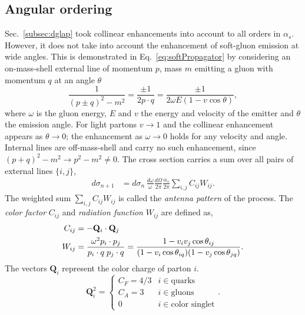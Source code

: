 \subsection{Angular ordering}
\label{sec:angularOrdering}
Sec.~\ref{subsec:dglap} took collinear enhancements into account to all orders in
\(\alpha_s\). However, it does not take into account the enhancement of soft-gluon emission at wide angles.
This is demonstrated in Eq.~\ref{eq:softPropagator} by considering an on-mass-shell external line of
momentum \(p\), mass \(m\) emitting a gluon with momentum \(q\)  at an angle \(\theta\)
\begin{equation}
	\frac{1}{(p\pm q)^2 - m^2} = \frac{\pm1}{2p\cdot q}
	= \frac{\pm1}{2\omega E(1-v\cos\theta)},
	\label{eq:softPropagator}
\end{equation}
where \(\omega\) is the gluon energy, \(E\) and \(v\) the energy and velocity of the
emitter and \(\theta\) the emission angle. For light partons \(v\to1\) and the
collinear enhancement appears as \(\theta\to0\); the enhancement as \(\omega\to0\)
holds for any velocity and angle. Internal lines  are off-mass-shell and carry no such enhancement, since
\((p+q)^2-m^2\to p^2-m^2\neq0\). The cross section carries a sum over all pairs of external lines \(\{i,j\}\),
\begin{align}
	\label{eq:antennaSplitXSec}
	d\sigma_{n+1} & = d\sigma_n\,\frac{d\omega}{\omega}\frac{d\Omega}{2\pi}
	\frac{\alpha_s}{2\pi}\sum_{i,j}C_{ij}W_{ij}.
\end{align}
The weighted sum \(\sum_{i,j}C_{ij}W_{ij}\)  is called the \emph{antenna pattern} of the process. The \emph{color factor} \(C_{ij}\) and \emph{radiation function} \(W_{ij}\)  are defined as,
\begin{align}
	C_{ij} & = -\mathbf{Q}_i\cdot\mathbf{Q}_j  \notag               \\
	W_{ij} & = \frac{\omega^2 p_i\cdot p_j}{p_i\cdot q\;p_j\cdot q}
	= \frac{1-v_iv_j\cos\theta_{ij}}
	{(1-v_i\cos\theta_{iq})(1-v_j\cos\theta_{jq})}.
\end{align}
The vectors \(\mathbf{Q}_{i}\) represent the color charge of parton \(i\).
\begin{equation}
	\mathbf{Q}_i^2 =
	\begin{cases}
		C_F = 4/3 & i \in \text{quarks}        \\[-15pt]
		C_A = 3   & i \in \text{gluons}        \\[-15pt]
		0         & i \in \text{color singlet}
	\end{cases}.
\end{equation}

